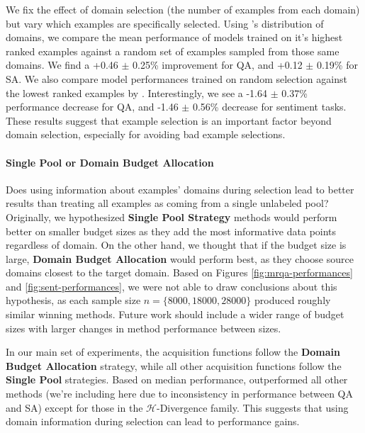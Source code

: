     We fix the effect of domain selection (the number of examples from each domain) but vary which examples are specifically selected.
    Using \dales{}'s distribution of domains, we compare the mean performance of models trained on it's highest ranked examples against a random set of examples sampled from those same domains.
    We find a \textcolor{mygreen}{+0.46} $\pm$ 0.25\% improvement for QA, and \textcolor{mygreen}{+0.12} $\pm$ 0.19\% for SA.
    We also compare model performances trained on random selection against the lowest ranked examples by \dales{}.
    Interestingly, we see a \textcolor{myred}{-1.64} $\pm$ 0.37\% performance decrease for QA, and \textcolor{myred}{-1.46} $\pm$ 0.56\% decrease for sentiment tasks.
    These results suggest that example selection is an important factor beyond domain selection, especially for avoiding bad example selections.

    \respace
    \paragraph{Single Pool or Domain Budget Allocation}
    Does using information about examples' domains during selection lead to better results than treating all examples as coming from a single unlabeled pool?
    Originally, we hypothesized \textbf{Single Pool Strategy} methods would perform better on smaller budget sizes as they add the most informative data points regardless of domain. 
    On the other hand, we thought that if the budget size is large, \textbf{Domain Budget Allocation} would perform best, as they choose source domains closest to the target domain. 
    Based on Figures \ref{fig:mrqa-performances} and \ref{fig:sent-performances}, we were not able to draw conclusions about this hypothesis, as each sample size $n=\{8000,18000,28000\}$ produced roughly similar winning methods. 
    Future work should include a wider range of budget sizes with larger changes in method performance between sizes.
    
    In our main set of experiments, the \rca{} acquisition functions follow the \textbf{Domain Budget Allocation} strategy, while all other acquisition functions follow the \textbf{Single Pool} strategies. 
    Based on median performance, \rcas{} outperformed all other methods (we're including \bald{} here due to inconsistency in performance between QA and SA) except for those in the $\mathcal{H}$-Divergence family. 
    This suggests that using domain information during selection can lead to performance gains.  
    
